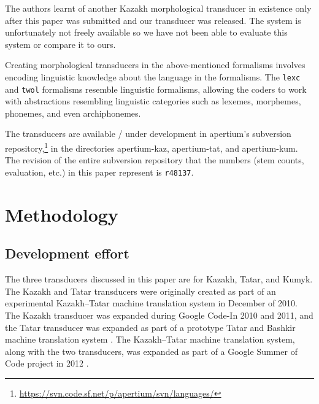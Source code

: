\documentclass[a4paper,11pt,twocolumn]{article}
\begin{document}
The authors learnt of another Kazakh morphological transducer in existence \citep{bekmanova2013} only after this paper was submitted and our transducer was released.  The system is unfortunately not freely available so we have not been able to evaluate this system or compare it to ours.

Creating morphological transducers in the above-mentioned formalisms involves encoding linguistic knowledge about the language in the formalisms.  The \texttt{lexc} and \texttt{twol} formalisms resemble linguistic formalisms, allowing the coders to work with abstractions resembling linguistic categories such as lexemes, morphemes, phonemes, and even archiphonemes.


The transducers are available / under development in apertium's subversion repository,\footnote{\url{https://svn.code.sf.net/p/apertium/svn/languages/}} in the directories apertium-kaz, apertium-tat, and apertium-kum.  The revision of the entire subversion repository that the numbers (stem counts, evaluation, etc.) in this paper represent is \texttt{r48137}.


\section{Methodology}\label{sec:methodology}





\subsection{Development effort}


The three transducers discussed in this paper are for Kazakh, Tatar, and Kumyk.  The Kazakh and Tatar transducers were originally created as part of an experimental Kazakh--Tatar machine translation system in December of 2010.  The Kazakh transducer was expanded during Google Code-In 2010 and 2011, and the Tatar transducer was expanded as part of a prototype Tatar and Bashkir machine translation system \citep{tyerswashingtonsalimzyanbattalov12}.  The Kazakh--Tatar machine translation system, along with the two transducers, was expanded as part of a Google Summer of Code project in 2012 \citep{salimzyanov2013}.
\end{document}

